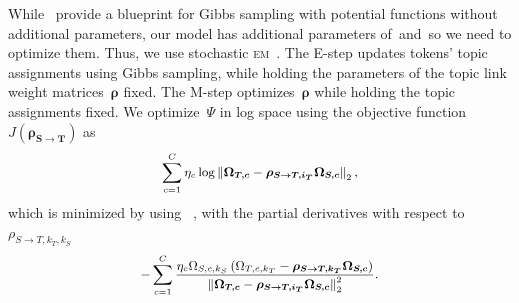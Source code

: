 While~ provide a blueprint for Gibbs
sampling with potential functions without additional parameters,
our model has additional parameters of~\rhost and~\rhots so we need to optimize them.
Thus, we use stochastic
\textsc{em}~\cite{celeux-1985-sem}. The E-step updates tokens'
topic assignments using Gibbs sampling, while holding the parameters of the
topic link weight matrices~$\bm{\rho}$ fixed.
The M-step optimizes~$\bm{\rho}$ while holding the topic
assignments fixed. We
optimize~$\Psi$ in log space using the objective
function~$J(\bm{\rho_{S \rightarrow T}})$ as
\begin{equation}\label{equ:rho_obj}
\small
\sum_{c=1}^{C} \eta_c \log \left\lVert \bm{\Omega_{T,c}} - \bm{\rho_{S \rightarrow T, i_T}} \bm{\Omega_{S,c}} \right\rVert_{2},
\end{equation}
which is minimized by using \lbfgs~\cite{liu-1989-lbfgs}, with the
partial derivatives with respect to~$\rho_{S \rightarrow T, k_T, k_S}$
\begin{equation}\label{equ:rho_grad}
\small
- \sum_{c=1}^{C} \frac {\eta_c \Omega_{S,c,k_S} \left( \Omega_{T,c,k_T} - \bm{\rho_{S \rightarrow T, k_T}} \bm{\Omega_{S,c}} \right)} {\left\lVert \bm{\Omega_{T,c}} - \bm{\rho_{S \rightarrow T, i_T}} \bm{\Omega_{S,c}} \right\rVert_{2}^2}.
\end{equation}

